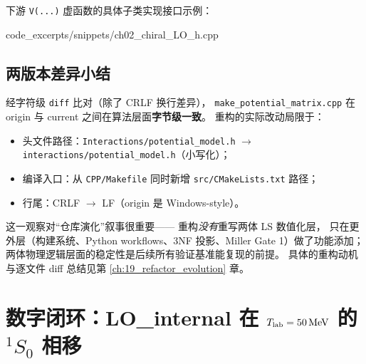 下游 \texttt{V(...)} 虚函数的具体子类实现接口示例：


  {code_excerpts/snippets/ch02_chiral_LO_h.cpp}

\subsection{两版本差异小结}

经字符级 \texttt{diff} 比对（除了 CRLF 换行差异），
\texttt{make\_potential\_matrix.cpp} 在 origin 与 current 之间在算法层面\textbf{字节级一致}。
重构的实际改动局限于：
\begin{itemize}
  \item 头文件路径：\texttt{Interactions/potential\_model.h} $\to$ \texttt{interactions/potential\_model.h}（小写化）；
  \item 编译入口：从 \texttt{CPP/Makefile} 同时新增 \texttt{src/CMakeLists.txt} 路径；
  \item 行尾：CRLF $\to$ LF（origin 是 Windows-style）。
\end{itemize}
这一观察对“仓库演化”叙事很重要——
重构\emph{没有}重写两体 LS 数值化层，
只在更外层（构建系统、Python workflows、3NF 投影、Miller Gate 1）做了功能添加；
两体物理逻辑层面的稳定性是后续所有验证基准能复现的前提。
具体的重构动机与逐文件 diff 总结见第 \ref{ch:19_refactor_evolution} 章。

\section{数字闭环：LO\_internal 在 \texorpdfstring{${T_{\text{lab}}} = \SI{50}{MeV}$}{Tlab = 50 MeV} 的 \texorpdfstring{$^1S_0$}{1S0} 相移}
\label{sec:ch02-numerical}

